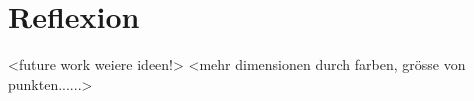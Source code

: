 \chapter{Reflexion}

<future work weiere ideen!>
<mehr dimensionen durch farben, grösse von punkten......>